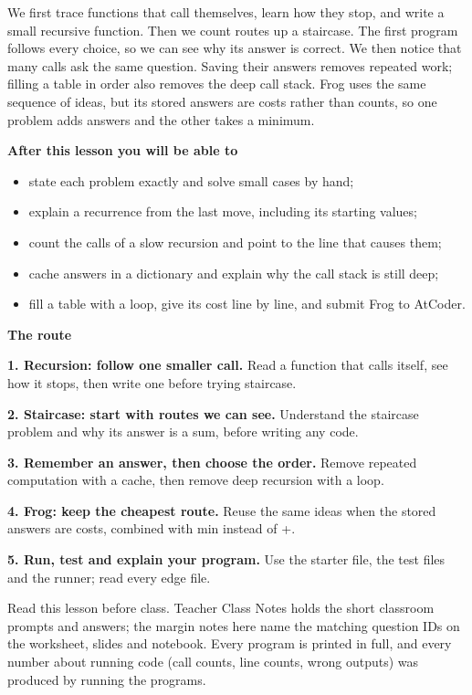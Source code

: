 \documentclass[11pt,a4paper,oneside]{report}
\begin{document}
We first trace functions that call themselves, learn how they stop, and write a small recursive function. Then we count routes up a staircase. The first program follows every choice, so we can see why its answer is correct. We then notice that many calls ask the same question. Saving their answers removes repeated work; filling a table in order also removes the deep call stack. Frog uses the same sequence of ideas, but its stored answers are costs rather than counts, so one problem adds answers and the other takes a minimum.

\textbf{After this lesson you will be able to}\begin{itemize}\item state each problem exactly and solve small cases by hand;\item explain a recurrence from the last move, including its starting values;\item count the calls of a slow recursion and point to the line that causes them;\item cache answers in a dictionary and explain why the call stack is still deep;\item fill a table with a loop, give its cost line by line, and submit Frog to AtCoder.\end{itemize}
\textbf{The route}\par
\textbf{1. Recursion: follow one smaller call.} Read a function that calls itself, see how it stops, then write one before trying staircase.\par
\textbf{2. Staircase: start with routes we can see.} Understand the staircase problem and why its answer is a sum, before writing any code.\par
\textbf{3. Remember an answer, then choose the order.} Remove repeated computation with a cache, then remove deep recursion with a loop.\par
\textbf{4. Frog: keep the cheapest route.} Reuse the same ideas when the stored answers are costs, combined with min instead of +.\par
\textbf{5. Run, test and explain your program.} Use the starter file, the test files and the runner; read every edge file.\par
Read this lesson before class. Teacher Class Notes holds the short classroom prompts and answers; the margin notes here name the matching question IDs on the worksheet, slides and notebook. Every program is printed in full, and every number about running code (call counts, line counts, wrong outputs) was produced by running the programs.
\end{document}
